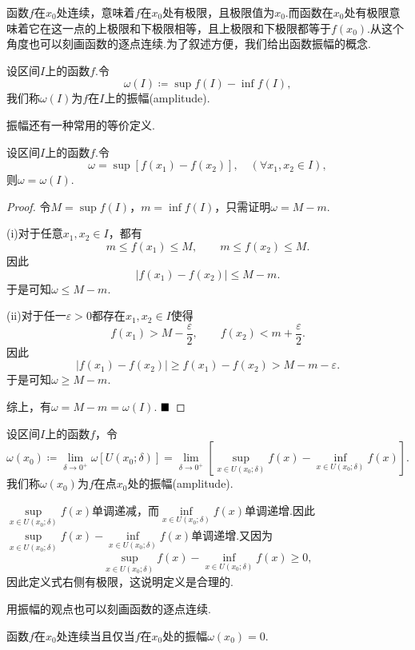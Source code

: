 函数$f$在$x_0$处连续，意味着$f$在$x_0$处有极限，且极限值为$x_0$.而函数在$x_0$处有极限意味着它在这一点的上极限和下极限相等，且上极限和下极限都等于$f(x_0)$.从这个角度也可以刻画函数的逐点连续.为了叙述方便，我们给出函数振幅的概念.
\begin{definition}[函数在区间上的振幅]
	设区间$I$上的函数$f$.令
	$$\omega(I)\coloneqq\sup f(I)-\inf f(I),$$
	我们称$\omega(I)$为$f$在$I$上的{\heiti 振幅}(amplitude).
\end{definition}
振幅还有一种常用的等价定义.
\begin{proposition}
	设区间$I$上的函数$f$.令
	$$\omega=\sup\left[f(x_1)-f(x_2)\right],\quad(\forall x_1,x_2\in I),$$
	则$\omega=\omega(I)$.
\end{proposition}
\begin{proof}
	令$M=\sup f(I)$，$m=\inf f(I)$，只需证明$\omega=M-m$.
	
	(i)对于任意$x_1,x_2\in I$，都有
	$$m\leqslant f(x_1)\leqslant M,\qquad m\leqslant f(x_2)\leqslant M.$$
	因此
	$$|f(x_1)-f(x_2)|\leqslant M-m.$$
	于是可知$\omega\leqslant M-m.$
	
	(ii)对于任一$\varepsilon>0$都存在$x_1,x_2\in I$使得
	$$f(x_1)>M-\frac{\varepsilon}{2},\qquad f(x_2)<m+\frac{\varepsilon}{2}.$$
	因此
	$$|f(x_1)-f(x_2)|\geqslant f(x_1)-f(x_2)>M-m-\varepsilon.$$
	于是可知$\omega\geqslant M-m$.
	
	综上，有$\omega=M-m=\omega(I).$
	$\hfill\blacksquare$
\end{proof}
\begin{definition}[函数在一点的振幅]\label{def:amplitude}
	设区间$I$上的函数$f$，令
	$$\omega(x_0)\coloneqq\lim\limits_{\delta\to 0^+}\omega\left[U(x_0;\delta)\right]=\lim\limits_{\delta\to 0^+}\left[\sup\limits_{x\in U(x_0;\delta)}f(x)-\inf\limits_{x\in U(x_0;\delta)}f(x)\right].$$
	我们称$\omega(x_0)$为$f$在点$x_0$处的{\heiti 振幅}(amplitude).
\end{definition}
\begin{remark}
$\sup\limits_{x\in U(x_0;\delta)}f(x)$单调递减，而$\inf\limits_{x\in U(x_0;\delta)}f(x)$单调递增.因此$\sup\limits_{x\in U(x_0;\delta)}f(x)-\inf\limits_{x\in U(x_0;\delta)}f(x)$单调递增.又因为
$$\sup\limits_{x\in U(x_0;\delta)}f(x)-\inf\limits_{x\in U(x_0;\delta)}f(x)\geqslant 0,$$
因此定义式右侧有极限，这说明定义是合理的.
\end{remark}
用振幅的观点也可以刻画函数的逐点连续.
\begin{theorem}\label{amplitude}
	函数$f$在$x_0$处连续当且仅当$f$在$x_0$处的振幅$\omega(x_0)=0$.
\end{theorem}
